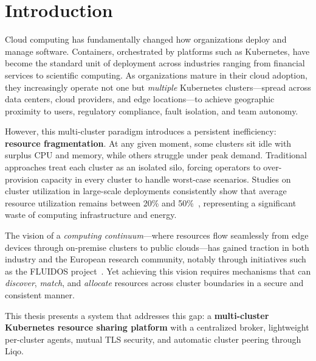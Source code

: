 
\chapter{Introduction}
\label{ch:introduction}

Cloud computing has fundamentally changed how organizations deploy and manage software. Containers, orchestrated by platforms such as Kubernetes, have become the standard unit of deployment across industries ranging from financial services to scientific computing. As organizations mature in their cloud adoption, they increasingly operate not one but \emph{multiple} Kubernetes clusters---spread across data centers, cloud providers, and edge locations---to achieve geographic proximity to users, regulatory compliance, fault isolation, and team autonomy.

However, this multi-cluster paradigm introduces a persistent inefficiency: \textbf{resource fragmentation}. At any given moment, some clusters sit idle with surplus CPU and memory, while others struggle under peak demand. Traditional approaches treat each cluster as an isolated silo, forcing operators to over-provision capacity in every cluster to handle worst-case scenarios. Studies on cluster utilization in large-scale deployments consistently show that average resource utilization remains between 20\% and 50\%~\cite{google-borg, azure-traces}, representing a significant waste of computing infrastructure and energy.

The vision of a \textit{computing continuum}---where resources flow seamlessly from edge devices through on-premise clusters to public clouds---has gained traction in both industry and the European research community, notably through initiatives such as the FLUIDOS project~\cite{fluidos}. Yet achieving this vision requires mechanisms that can \emph{discover}, \emph{match}, and \emph{allocate} resources across cluster boundaries in a secure and consistent manner.

This thesis presents a system that addresses this gap: a \textbf{multi-cluster Kubernetes resource sharing platform} with a centralized broker, lightweight per-cluster agents, mutual TLS security, and automatic cluster peering through Liqo.


